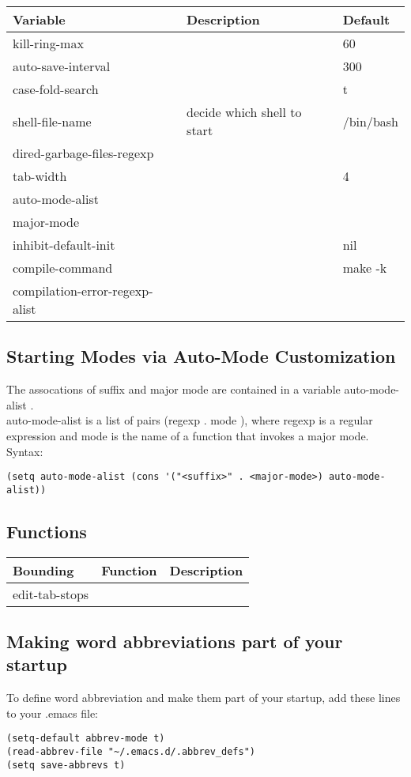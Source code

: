 \documentclass[11pt]{article}
\begin{document}
\begin{center}
\begin{tabular}{lll}
Variable & Description & Default\\
\hline
kill-ring-max &  & 60\\
auto-save-interval &  & 300\\
case-fold-search &  & t\\
shell-file-name & decide which shell to start & /bin/bash\\
dired-garbage-files-regexp &  & \\
tab-width &  & 4\\
auto-mode-alist &  & \\
major-mode &  & \\
inhibit-default-init &  & nil\\
compile-command &  & make -k\\
compilation-error-regexp-alist &  & \\
\end{tabular}
\end{center}

\subsection{Starting Modes via Auto-Mode Customization}
\label{sec-1-5}
The assocations of suffix and major mode are contained in a variable auto-mode-alist . \\
auto-mode-alist is a list of pairs (regexp . mode ), where regexp is a regular expression and mode is the name of a function that invokes a major mode. \\

Syntax: \\
\begin{verbatim}
(setq auto-mode-alist (cons '("<suffix>" . <major-mode>) auto-mode-alist))
\end{verbatim}


\subsection{Functions}
\label{sec-1-6}
\begin{center}
\begin{tabular}{lll}
Bounding & Function & Description\\
\hline
edit-tab-stops &  & \\
\end{tabular}
\end{center}

\subsection{Making word abbreviations part of your startup}
\label{sec-1-7}
To define word abbreviation and make them part of your startup, add these lines to your .emacs file: \\
\begin{verbatim}
(setq-default abbrev-mode t)
(read-abbrev-file "~/.emacs.d/.abbrev_defs")
(setq save-abbrevs t)
\end{verbatim}
\end{document}
